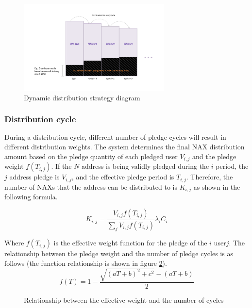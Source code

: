 \begin{figure}[htbp]
  \centering
  \includegraphics[width=0.68\textwidth]{../common/dynamic_dist.pdf}
  \caption{Dynamic distribution strategy diagram\label{fig:dynamic_dist}}
\end{figure}

\subsubsection{Distribution cycle}
During a distribution cycle, different number of pledge cycles will result in different distribution weights. The system determines the final NAX distribution amount based on the pledge quantity of each pledged user $V_{i, j}$ and the pledge weight \(f(T_{i, j})\). If the $N$ address is being validly pledged during the $i$ period, the $j$ address pledge is $V_{i,j}$, and the effective pledge period is $T_{i,j}$. Therefore, the number of NAXs that the address can be distributed to is $K_{i,j}$ as shown in the following formula.

\begin{equation}
  K_{i,j} = \frac{V_{i,j} f(T_{i,j})}{\sum_j V_{i,j} f(T_{i,j})} \lambda_i C_i
\end{equation}

Where \(f(T_{i,j})\) is the effective weight function for the pledge of the \(i\) user\(j\). The relationship between the pledge weight and the number of pledge cycles is as follows (the function relationship is shown in figure \ref{weight}).
\begin{equation}
  f(T) = 1 - \frac{\sqrt{(aT+b)^2+c^2}-(aT+b)}{2}
\end{equation}

\begin{figure}[h]
\centering
\caption{Relationship between the effective weight and the number of cycles}\label{weight}
\end{figure}

